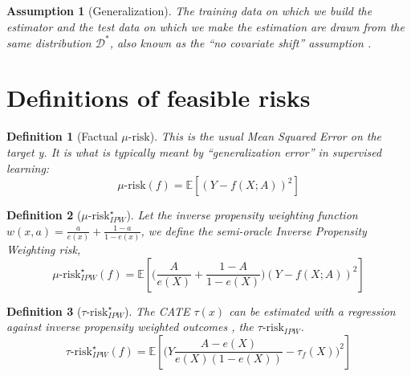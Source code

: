 \documentclass[11pt]{article}
\let\cite=\supercite
\newtheorem{definition}{Definition}
\newtheorem{assumption}{Assumption}
\begin{document}
\begin{appendices}
    \begin{assumption}[Generalization]\label{assumption:generalization} The training
        data on which we build the estimator and the test data on which we make the
        estimation are drawn from the same distribution $\mathcal D^*$, also known as
        the ``no covariate shift'' assumption \cite{jesson_identifying_2020}.
    \end{assumption}

    \section{Definitions of feasible risks}\label{def:feasible_risks}


    \begin{definition}[Factual $\mu\text{-risk}$]\label{def:mu_risk}
        \cite{shalit_estimating_2017} This is the usual Mean Squared Error on
        the target y. It is what is typically meant by ``generalization error'' in
        supervised learning:
        \begin{equation*}\label{eq:mu_risk}
            \mu\text{-risk}(f)=\mathbb{E}\left[(Y-f(X ; A))^2 \right]
        \end{equation*}
    \end{definition}


    \begin{definition}[$\mu\text{-risk}_{IPW}^{\star}$]\label{def:mu_ipw_risk}
        \cite{vanderlaan_unified_2003} Let the inverse propensity weighting
        function $w(x, a) = \frac{a}{e(x)} + \frac{1 - a}{1 - e(x)}$, we define the
        semi-oracle Inverse Propensity Weighting risk,
        \begin{equation*}\label{eq:mu_ipw_risk}
            \mu\text{-risk}_{IPW}^{\star}(f) = \mathbb{E}\left[ \Big( \frac{A}{e(X)} + \frac{1-A}{1-e(X)} \Big) (Y-f(X ; A))^2 \right]
        \end{equation*}
    \end{definition}

    \smallskip


    \begin{definition}[$\tau\text{-risk}^{\star}_{IPW}$]\label{def:tau_ipw_risk}
        \cite{wager_estimation_2018}
        The CATE $\tau(x)$ can be estimated with a
        regression against inverse propensity weighted outcomes \cite{
            athey2016recursive,gutierrez_causal_2016,wager_estimation_2018},
        the $\tau\text{-risk}_{IPW}$.
        \begin{equation*}
            \tau\text{-risk}^{\star}_{IPW}(f) =\mathbb{E}
            \left[ \Big(Y \frac{A - e(X)}{e(X)
                    (1-e(X))}-\tau_f\left(X\right)\Big)^2 \right]
        \end{equation*}
    \end{definition}


\end{appendices}
\end{document}
